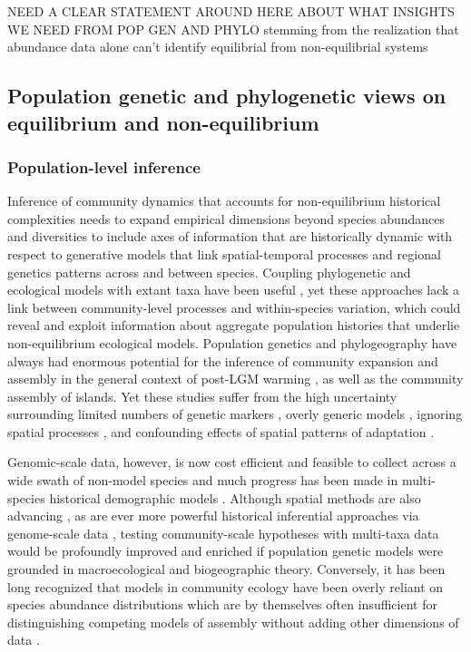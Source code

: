 \documentclass[12pt]{article}
\begin{document}
NEED A CLEAR STATEMENT AROUND HERE ABOUT WHAT INSIGHTS WE NEED FROM
POP GEN AND PHYLO stemming from the realization that abundance data
alone can't identify equilibrial from non-equilibrial systems

\subsection{Population genetic and phylogenetic views on equilibrium and non-equilibrium}

\subsubsection{Population-level inference}

Inference of community dynamics that accounts for non-equilibrium
historical complexities needs to expand empirical dimensions beyond
species abundances and diversities to include axes of information that
are historically dynamic with respect to generative models that link
spatial-temporal processes and regional genetics patterns across and
between species. Coupling phylogenetic and ecological models with
extant taxa have been useful \cite{Emerson2008-xb, Rosindell2015-dk,
  Burbrink2015-yh}, yet these approaches lack a link between
community-level processes and within-species variation, which could
reveal and exploit information about aggregate population histories
that underlie non-equilibrium ecological models. Population genetics
and phylogeography have always had enormous potential for the
inference of community expansion and assembly in the general context
of post-LGM warming \cite{Hewitt2004-my}, as well as the community
assembly of islands. Yet these studies suffer from the high
uncertainty surrounding limited numbers of genetic markers
\cite{Chan2014-nq}, overly generic models \cite{Papadopoulou2016-ki},
ignoring spatial processes \cite{Meirmans2012-uw}, and confounding
effects of spatial patterns of adaptation \cite{Hoban2016-wc}.

Genomic-scale data, however, is now cost efficient and feasible to
collect across a wide swath of non-model species and much progress has
been made in multi-species historical demographic models
\cite{Xue2015-el}. Although spatial methods are also advancing
\cite{Petkova2016-rw, Joseph2016-iu, Prates2016-xv, Brown2016-th}, as
are ever more powerful historical inferential approaches via
genome-scale data \cite{Terhorst2016-wl}, testing community-scale
hypotheses with multi-taxa data would be profoundly improved and
enriched if population genetic models were grounded in macroecological
and biogeographic theory. Conversely, it has been long recognized that
models in community ecology have been overly reliant on species
abundance distributions which are by themselves often insufficient for
distinguishing competing models of assembly without adding other
dimensions of data \cite{McGill2003-jy,McGill2007-hx}.
\end{document}
